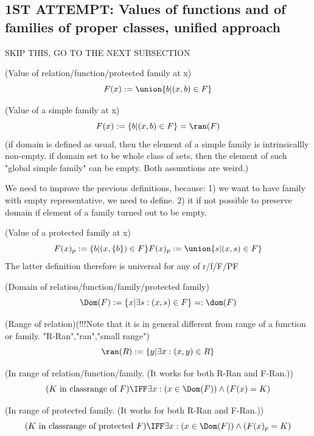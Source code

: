 \def\topic{}


\subsection{1ST ATTEMPT: Values of functions and of families of proper classes, unified approach}
SKIP THIS, GO TO THE NEXT SUBSECTION
\begin{definition}(Value of relation/function/protected family at x)
\[
F(x):=\union\{b|(x,b)\in F\}
\]
\end{definition}
\begin{definition}(Value of a simple family at x)
\[
F(x) :=\{b|(x,b)\in F\}=\ran(F)
\]
(if domain is defined as usual, then the element of a simple family is intrinsicallly non-empty. if domain set to be whole class of sets, then the element of such "global simple family" can be empty. Both assumtions are weird.)
\end{definition}
We need to improve the previous definitions, because:
1) we want to have family with empty representative, we need to define.
2) it if not possible to preserve domain if element of a family turned out to be empty.
\begin{definition}(Value of a protected family at x)
\[
F(x)_p := \{b|(x,\{b\})\in F\}
F(x)_p := \union\{s|(x,s)\in F\}
\]
The latter definition therefore is universal for any of r/f/F/PF
\end{definition}


\begin{definition}(Domain of relation/function/family/protected family)
\[
\Dom(F):=\{x|\exists s:(x,s)\in F\}=:\dom(F)
\]
\end{definition}

\begin{definition}(Range of relation)(!!!Note that it is in general different from range of a function or family. "R-Ran","ran","small range")
\[
\ran(R):=\{y|\exists x:(x,y)\in R\}
\]
\end{definition}

\begin{definition}(In range of relation/function/family. (It works for both R-Ran and F-Ran.))
\[
(K\mbox{ in classrange of }F) \IFF \exists x: (x \in \Dom(F)) \land (F(x)=K)
\]
\end{definition}
\begin{definition}(In range of protected family. (It works for both R-Ran and F-Ran.))
\[
(K\mbox{ in classrange of protected }F) \IFF \exists x: (x \in \Dom(F)) \land (F(x)_p=K)
\]
\end{definition}


